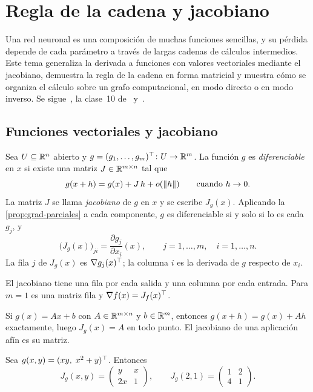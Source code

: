 \chapter{Regla de la cadena y jacobiano}
\label{tema:2}

Una red neuronal es una composición de muchas funciones sencillas, y su pérdida depende de cada parámetro a través de largas cadenas de cálculos intermedios. Este tema generaliza la derivada a funciones con valores vectoriales mediante el jacobiano, demuestra la regla de la cadena en forma matricial y muestra cómo se organiza el cálculo sobre un grafo computacional, en modo directo o en modo inverso. Se sigue~\cite[§5.2, §5.3 y §5.6]{mml}, la clase~10 de~\cite{mit1802} y~\cite[§6.5]{gbc}.

\section{Funciones vectoriales y jacobiano}

\begin{definicion}[Jacobiano]\label{def:jacobiano}
Sea $U\subseteq\mathbb{R}^{n}$ abierto y $g=(g_1,\dots,g_m)^{\top}\colon U\to\mathbb{R}^{m}$. La función $g$ es \emph{diferenciable} en $x$ si existe una matriz $J\in\mathbb{R}^{m\times n}$ tal que
\[
g(x+h)=g(x)+J\,h+o(\lVert h\rVert)\qquad\text{cuando } h\to 0.
\]
La matriz $J$ se llama \emph{jacobiano} de $g$ en $x$ y se escribe $J_g(x)$. Aplicando la \cref{prop:grad-parciales} a cada componente, $g$ es diferenciable si y solo si lo es cada $g_j$, y
\[
\bigl(J_g(x)\bigr)_{ji}=\frac{\partial g_j}{\partial x_i}(x),\qquad j=1,\dots,m,\quad i=1,\dots,n.
\]
La fila $j$ de $J_g(x)$ es $\nabla g_j(x)^{\top}$; la columna $i$ es la derivada de $g$ respecto de $x_i$.
\end{definicion}

El jacobiano tiene una fila por cada salida y una columna por cada entrada. Para $m=1$ es una matriz fila y $\nabla f(x)=J_f(x)^{\top}$.

\begin{ejemplo}\label{ej:jac-lineal}
Si $g(x)=Ax+b$ con $A\in\mathbb{R}^{m\times n}$ y $b\in\mathbb{R}^{m}$, entonces $g(x+h)=g(x)+Ah$ exactamente, luego $J_g(x)=A$ en todo punto. El jacobiano de una aplicación afín es su matriz.
\end{ejemplo}

\begin{ejemplo}\label{ej:jac}
Sea $g(x,y)=(xy,\;x^{2}+y)^{\top}$. Entonces
\[
J_g(x,y)=\begin{pmatrix} y & x\\ 2x & 1\end{pmatrix},\qquad J_g(2,1)=\begin{pmatrix} 1 & 2\\ 4 & 1\end{pmatrix}.
\]
\end{ejemplo}

